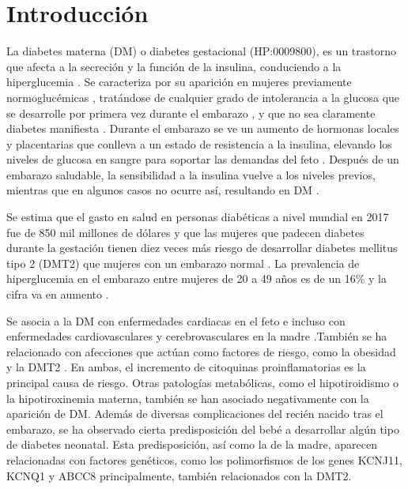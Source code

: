 \section{Introducción}

La diabetes materna (DM) o diabetes gestacional (HP:0009800), es un trastorno que afecta a la secreción y la función de la insulina, conduciendo a la hiperglucemia \cite{Rodolaki2023}. Se caracteriza por su aparición en mujeres previamente normoglucémicas \cite{Rodolaki2023}, tratándose de cualquier grado de intolerancia a la glucosa que se desarrolle por primera vez durante el embarazo \cite{ADB2009}, y que no sea claramente diabetes manifiesta \cite{Grazia2020}. Durante el embarazo se ve un aumento de hormonas locales y placentarias que conlleva a un estado de resistencia a la insulina, elevando los niveles de glucosa en sangre para soportar las demandas del feto \cite{Plows2018}. Después de un embarazo saludable, la sensibilidad a la insulina vuelve a los niveles previos, mientras que en algunos casos no ocurre así, resultando en DM \cite{Plows2018}.


Se estima que el gasto en salud en personas diabéticas a nivel mundial en 2017 fue de 850 mil millones de dólares \cite{Cho2018} y que las mujeres que padecen diabetes durante la gestación tienen diez veces más riesgo de desarrollar diabetes mellitus tipo 2 (DMT2) que mujeres con un embarazo normal \cite{Vounzoulaki2020} \cite{You2021}. La prevalencia de hiperglucemia en el embarazo entre mujeres de 20 a 49 años es de un 16\% y la cifra va en aumento \cite{Guariguata2014}.

Se asocia a la DM con enfermedades cardiacas en el feto \cite{Depla2021} e incluso con enfermedades cardiovasculares y cerebrovasculares en la madre \cite{Xie2022}.También se ha relacionado con afecciones que actúan como factores de riesgo, como la obesidad\cite{Shah2011} y la DMT2 \cite{Haroush2004}. En ambas, el incremento de citoquinas proinflamatorias es la principal causa de riesgo\cite{Pantham2015}. Otras patologías metabólicas, como el hipotiroidismo\cite{Gong2016} o la hipotiroxinemia materna\cite{Topaloglu2022}, también se han asociado negativamente con la aparición de DM.
Además de diversas complicaciones del recién nacido tras el embarazo\cite{Depla2021}\cite{Metzger2010}, se ha observado cierta predisposición del bebé a desarrollar algún tipo de diabetes neonatal\cite{Dabelea2000}. Esta predisposición, así como la de la madre, aparecen relacionadas con factores genéticos, como los polimorfismos de los genes KCNJ11, KCNQ1\cite{Ao2015} y ABCC8 \cite{Piccini2018} principalmente, también relacionados con la DMT2\cite{Khan2020}.


